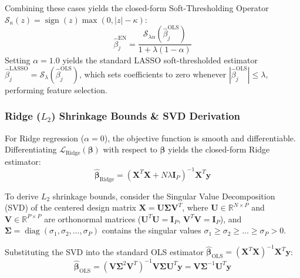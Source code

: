 Combining these cases yields the closed-form Soft-Thresholding Operator $\mathcal{S}_{\kappa}(z) = \operatorname{sign}(z) \max(0, |z| - \kappa)$:
\begin{equation}
\hat{\beta}_j^{\text{EN}} = \frac{\mathcal{S}_{\lambda \alpha}\left( \hat{\beta}_j^{\text{OLS}} \right)}{1 + \lambda (1-\alpha)}
\label{eq:ch3_soft_thresholding_en}
\end{equation}
Setting $\alpha = 1.0$ yields the standard LASSO soft-thresholded estimator $\hat{\beta}_j^{\text{LASSO}} = \mathcal{S}_{\lambda}\left( \hat{\beta}_j^{\text{OLS}} \right)$, which sets coefficients to zero whenever $|\hat{\beta}_j^{\text{OLS}}| \le \lambda$, performing feature selection.

\subsubsection{Ridge ($L_2$) Shrinkage Bounds \& SVD Derivation}
For Ridge regression ($\alpha = 0$), the objective function is smooth and differentiable. Differentiating $\mathcal{L}_{\text{Ridge}}(\boldsymbol{\beta})$ with respect to $\boldsymbol{\beta}$ yields the closed-form Ridge estimator:
\begin{equation}
\hat{\boldsymbol{\beta}}_{\text{Ridge}} = \left( \mathbf{X}^T \mathbf{X} + N \lambda \mathbf{I}_P \right)^{-1} \mathbf{X}^T \mathbf{y}
\label{eq:ch3_ridge_closed_form}
\end{equation}

To derive $L_2$ shrinkage bounds, consider the Singular Value Decomposition (SVD) of the centered design matrix $\mathbf{X} = \mathbf{U} \mathbf{\Sigma} \mathbf{V}^T$, where $\mathbf{U} \in \mathbb{R}^{N \times P}$ and $\mathbf{V} \in \mathbb{R}^{P \times P}$ are orthonormal matrices ($\mathbf{U}^T \mathbf{U} = \mathbf{I}_P$, $\mathbf{V}^T \mathbf{V} = \mathbf{I}_P$), and $\mathbf{\Sigma} = \operatorname{diag}(\sigma_1, \sigma_2, \dots, \sigma_P)$ contains the singular values $\sigma_1 \ge \sigma_2 \ge \dots \ge \sigma_P > 0$.

Substituting the SVD into the standard OLS estimator $\hat{\boldsymbol{\beta}}_{\text{OLS}} = (\mathbf{X}^T \mathbf{X})^{-1} \mathbf{X}^T \mathbf{y}$:
\begin{equation}
\hat{\boldsymbol{\beta}}_{\text{OLS}} = \left( \mathbf{V} \mathbf{\Sigma}^2 \mathbf{V}^T \right)^{-1} \mathbf{V} \mathbf{\Sigma} \mathbf{U}^T \mathbf{y} = \mathbf{V} \mathbf{\Sigma}^{-1} \mathbf{U}^T \mathbf{y}
\end{equation}

